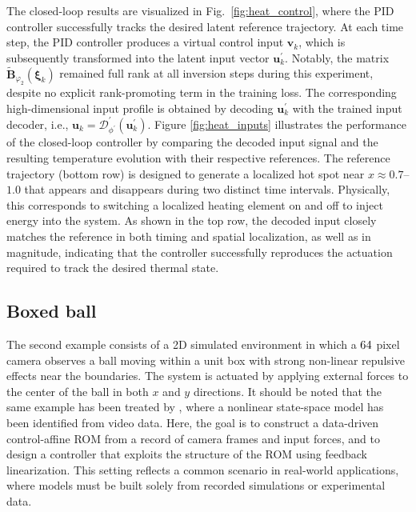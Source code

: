 \documentclass{article}
\begin{document}
The closed-loop results are visualized in Fig.~\ref{fig:heat_control}, where the PID controller successfully tracks the desired latent reference trajectory.
At each time step, the PID controller produces a virtual control input $\mathbf{v}_k$, which is subsequently transformed into the latent input vector $\mathbf{u}^\prime_k$.
Notably, the matrix $\widetilde{\mathbf{B}}_{\varphi_2}(\boldsymbol{\xi}_k)$ remained full rank at all inversion steps during this experiment, despite no explicit rank-promoting term in the training loss.
The corresponding high-dimensional input profile is obtained by decoding $\mathbf{u}^\prime_k$ with the trained input decoder, i.e., $\mathbf{u}_k = \mathcal{D}^\prime_{\phi^\prime}(\mathbf{u}^\prime_k)$.
Figure \ref{fig:heat_inputs} illustrates the performance of the closed-loop controller by comparing the decoded input signal and the resulting temperature evolution with their respective references. The reference trajectory (bottom row) is designed to generate a localized hot spot near $x \approx 0.7$--$1.0$ that appears and disappears during two distinct time intervals. Physically, this corresponds to switching a localized heating element on and off to inject energy into the system. As shown in the top row, the decoded input closely matches the reference in both timing and spatial localization, as well as in magnitude, indicating that the controller successfully reproduces the actuation required to track the desired thermal state.


\subsection{Boxed ball}
\label{sec:ball}
The second example consists of a 2D simulated environment in which a  $64\time 64$ pixel camera observes a ball moving within a unit box with strong non-linear repulsive effects near the boundaries.
The system is actuated by applying external forces to the center of the ball in both $x$ and $y$ directions.
It should be noted that the same example has been treated by \cite{beintema2021non}, where a nonlinear state-space model has been identified from video data.
Here, the goal is to construct a data-driven control-affine ROM from a record of camera frames and input forces, and to design a controller that exploits the structure of the ROM using feedback linearization.
This setting reflects a common scenario in real-world applications, where models must be built solely from recorded simulations or experimental data.
\end{document}
